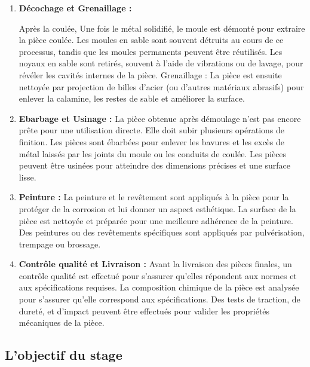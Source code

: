 \documentclass[12pt]{article}
\begin{document}
\begin{enumerate}
    \item \textbf{Décochage et Grenaillage :} 

    Après la coulée, Une fois le métal solidifié, le moule est démonté pour extraire 
    la pièce coulée. Les moules en sable sont souvent détruits au cours de ce processus,
    tandis que les moules permanents peuvent être réutilisés. Les noyaux en sable sont 
    retirés, souvent à l'aide de vibrations ou de lavage, pour révéler les cavités 
    internes de la pièce. Grenaillage : La pièce est ensuite nettoyée par projection 
    de billes d'acier (ou d'autres matériaux abrasifs) pour enlever la calamine, les 
    restes de sable et améliorer la surface.
    
    \item \textbf{Ebarbage et Usinage :} 
    La pièce obtenue après démoulage n'est pas encore prête pour une utilisation directe. 
    Elle doit subir plusieurs opérations de finition. Les pièces sont ébarbées pour 
    enlever les bavures et les excès de métal laissés par les joints du moule ou les 
    conduits de coulée. Les pièces peuvent être usinées pour atteindre des dimensions 
    précises et une surface lisse.
    

    \item \textbf{Peinture :} La peinture et le revêtement sont appliqués à la pièce 
    pour la protéger de la corrosion et lui donner un aspect esthétique. La surface de 
    la pièce est nettoyée et préparée pour une meilleure adhérence de la peinture.
    Des peintures ou des revêtements spécifiques sont appliqués par pulvérisation, 
    trempage ou brossage.



    \item \textbf{Contrôle qualité et Livraison :} Avant la livraison des pièces finales, un 
    contrôle qualité est effectué pour s'assurer qu'elles répondent aux normes et 
    aux spécifications requises. La composition chimique de la pièce est analysée pour 
    s'assurer qu'elle correspond aux spécifications. Des tests de traction, de dureté, 
    et d'impact peuvent être effectués pour valider les propriétés mécaniques de la 
    pièce.
\end{enumerate}



\subsection{L'objectif du stage }
\end{document}
